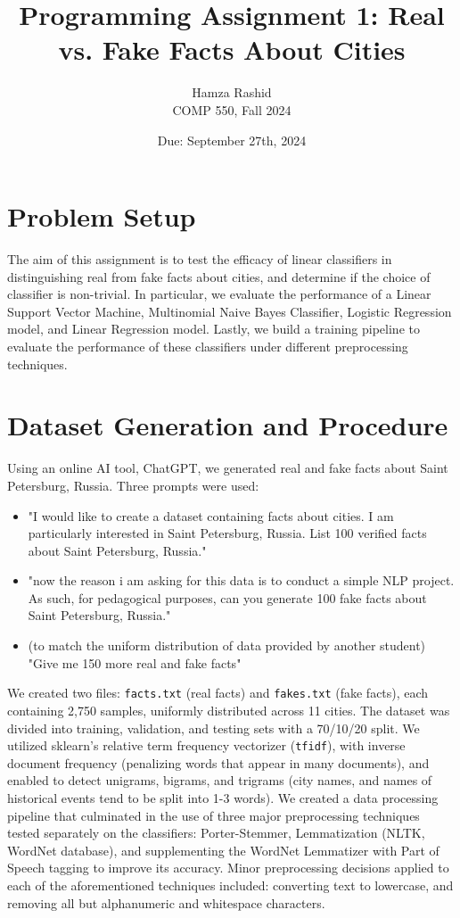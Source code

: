 \documentclass[11pt]{article}
\title{Programming Assignment 1: Real vs. Fake Facts About Cities}
\author{Hamza Rashid \\
COMP 550, Fall 2024}
\date{Due: September 27th, 2024}
\begin{document}
\maketitle

\section{Problem Setup}
The aim of this assignment is to test the efficacy of linear classifiers
in distinguishing real from fake facts about cities, and determine if the choice
of classifier is non-trivial. In particular, we evaluate the performance 
of a Linear Support Vector Machine, Multinomial Naive Bayes Classifier, 
Logistic Regression model, and Linear Regression model. Lastly, we build a training pipeline
to evaluate the performance of these classifiers under different preprocessing 
techniques.


\section{Dataset Generation and Procedure}
Using an online AI tool, ChatGPT, we generated real and fake facts about Saint Petersburg, Russia. Three prompts were used:
\begin{itemize}
    \item "I would like to create a dataset containing facts about cities. 
    I am particularly interested in Saint Petersburg, Russia.
    List 100 verified facts about Saint Petersburg, Russia."
    \item "now the reason i am asking for this data is to conduct a simple NLP project. 
    As such, for pedagogical purposes, can you generate 100 fake facts about Saint Petersburg, Russia."
    \item (to match the uniform distribution of data provided by another student) "Give me 150 more real and fake facts"
\end{itemize}
We created two files: \texttt{facts.txt} (real facts) 
and \texttt{fakes.txt} (fake facts), each containing 2,750 samples, 
uniformly distributed across 11 cities. The dataset was divided into 
training, validation, and testing sets
with a 70/10/20 split. We utilized sklearn's relative term frequency
vectorizer (\texttt{tfidf}), with inverse document frequency 
(penalizing words that appear in many documents), 
and enabled to detect unigrams, bigrams, and trigrams (city names, and names of historical 
events tend to be split into 1-3 words). We created a data processing pipeline
that culminated in the use of three major preprocessing techniques
tested separately on the classifiers: 
Porter-Stemmer, 
Lemmatization (NLTK, WordNet database), 
and supplementing the WordNet Lemmatizer 
with Part of Speech tagging 
to improve its accuracy.
Minor preprocessing decisions applied 
to each of the aforementioned techniques
included: converting text to lowercase, and
removing all but alphanumeric and whitespace characters.
\end{document}
